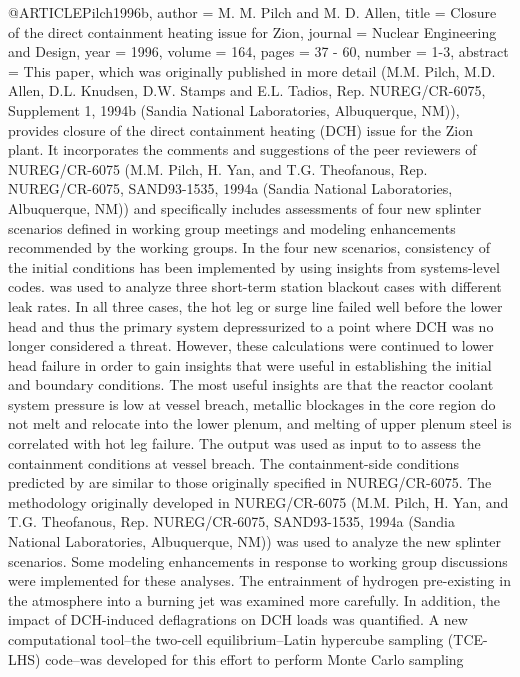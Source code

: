 {@ARTICLE{Pilch1996b,
  author = {M. M. Pilch and M. D. Allen},
  title = {Closure of the direct containment heating issue for Zion},
  journal = {Nuclear Engineering and Design},
  year = {1996},
  volume = {164},
  pages = {37 - 60},
  number = {1-3},
  abstract = {This paper, which was originally published in more detail (M.M. Pilch,
	M.D. Allen, D.L. Knudsen, D.W. Stamps and E.L. Tadios, Rep. NUREG/CR-6075,
	Supplement 1, 1994b (Sandia National Laboratories, Albuquerque, NM)),
	provides closure of the direct containment heating (DCH) issue for
	the Zion plant. It incorporates the comments and suggestions of the
	peer reviewers of NUREG/CR-6075 (M.M. Pilch, H. Yan, and T.G. Theofanous,
	Rep. NUREG/CR-6075, SAND93-1535, 1994a (Sandia National Laboratories,
	Albuquerque, NM)) and specifically includes assessments of four new
	splinter scenarios defined in working group meetings and modeling
	enhancements recommended by the working groups. In the four new scenarios,
	consistency of the initial conditions has been implemented by using
	insights from systems-level codes. was used to analyze three short-term
	station blackout cases with different leak rates. In all three cases,
	the hot leg or surge line failed well before the lower head and thus
	the primary system depressurized to a point where DCH was no longer
	considered a threat. However, these calculations were continued to
	lower head failure in order to gain insights that were useful in
	establishing the initial and boundary conditions. The most useful
	insights are that the reactor coolant system pressure is low at vessel
	breach, metallic blockages in the core region do not melt and relocate
	into the lower plenum, and melting of upper plenum steel is correlated
	with hot leg failure. The output was used as input to to assess the
	containment conditions at vessel breach. The containment-side conditions
	predicted by are similar to those originally specified in NUREG/CR-6075.
	The methodology originally developed in NUREG/CR-6075 (M.M. Pilch,
	H. Yan, and T.G. Theofanous, Rep. NUREG/CR-6075, SAND93-1535, 1994a
	(Sandia National Laboratories, Albuquerque, NM)) was used to analyze
	the new splinter scenarios. Some modeling enhancements in response
	to working group discussions were implemented for these analyses.
	The entrainment of hydrogen pre-existing in the atmosphere into a
	burning jet was examined more carefully. In addition, the impact
	of DCH-induced deflagrations on DCH loads was quantified. A new computational
	tool--the two-cell equilibrium--Latin hypercube sampling (TCE-LHS)
	code--was developed for this effort to perform Monte Carlo sampling
}}}
